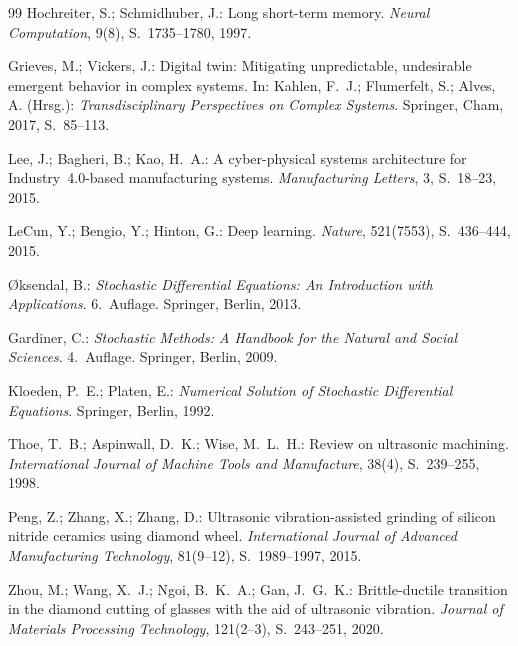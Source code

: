 ﻿\documentclass[a4paper,12pt]{article}
\theoremstyle{definition}
\begin{document}
\begin{thebibliography}{99}
Hochreiter, S.; Schmidhuber, J.:
Long short-term memory.
\textit{Neural Computation}, 9(8), S.~1735--1780, 1997.
 
Grieves, M.; Vickers, J.:
Digital twin: Mitigating unpredictable, undesirable emergent behavior in complex systems.
In: Kahlen, F.~J.; Flumerfelt, S.; Alves, A. (Hrsg.):
\textit{Transdisciplinary Perspectives on Complex Systems}.
Springer, Cham, 2017, S.~85--113.
 
Lee, J.; Bagheri, B.; Kao, H.~A.:
A cyber-physical systems architecture for Industry~4.0-based manufacturing systems.
\textit{Manufacturing Letters}, 3, S.~18--23, 2015.
 
LeCun, Y.; Bengio, Y.; Hinton, G.:
Deep learning.
\textit{Nature}, 521(7553), S.~436--444, 2015.
 
 
{\O}ksendal, B.:
\textit{Stochastic Differential Equations: An Introduction with Applications}.
6.~Auflage. Springer, Berlin, 2013.
 
Gardiner, C.:
\textit{Stochastic Methods: A Handbook for the Natural and Social Sciences}.
4.~Auflage. Springer, Berlin, 2009.
 
Kloeden, P.~E.; Platen, E.:
\textit{Numerical Solution of Stochastic Differential Equations}.
Springer, Berlin, 1992.
 
 
Thoe, T.~B.; Aspinwall, D.~K.; Wise, M.~L.~H.:
Review on ultrasonic machining.
\textit{International Journal of Machine Tools and Manufacture}, 38(4), S.~239--255, 1998.
 
Peng, Z.; Zhang, X.; Zhang, D.:
Ultrasonic vibration-assisted grinding of silicon nitride ceramics using diamond wheel.
\textit{International Journal of Advanced Manufacturing Technology}, 81(9--12),
S.~1989--1997, 2015.
 
Zhou, M.; Wang, X.~J.; Ngoi, B.~K.~A.; Gan, J.~G.~K.:
Brittle-ductile transition in the diamond cutting of glasses with the aid of ultrasonic vibration.
\textit{Journal of Materials Processing Technology}, 121(2--3), S.~243--251, 2020.
 

\end{thebibliography}
\end{document}
